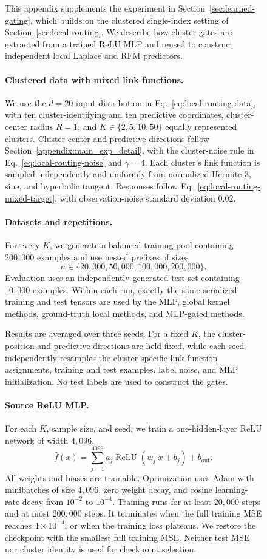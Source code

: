 \documentclass{article}
\newcounter{setting}[section]
\newcounter{initialization}[section]
\begin{document}
\begin{figure}
This appendix supplements the experiment in
Section~\ref{sec:learned-gating}, which builds on the clustered single-index
setting of Section~\ref{sec:local-routing}. We describe how cluster gates are
extracted from a trained ReLU MLP and reused to construct independent local
Laplace and RFM predictors.

\paragraph{Clustered data with mixed link functions.}
We use the \(d=20\) input distribution in
Eq.~\ref{eq:local-routing-data}, with ten cluster-identifying and ten
predictive coordinates, cluster-center radius \(R=1\), and
\(K\in\{2,5,10,50\}\) equally represented clusters. Cluster-center and
predictive directions follow Section~\ref{appendix:main_exp_detail},
with the cluster-noise rule in Eq.~\ref{eq:local-routing-noise} and
\(\gamma=4\). Each cluster's link function is sampled independently and
uniformly from normalized Hermite-3, sine, and hyperbolic tangent.
Responses follow Eq.~\ref{eq:local-routing-mixed-target}, with
observation-noise standard deviation \(0.02\).

\paragraph{Datasets and repetitions.}
For every \(K\), we generate a balanced training pool containing
\(200{,}000\) examples and use nested prefixes of sizes
\[
    n\in\{20{,}000,50{,}000,100{,}000,200{,}000\}.
\]
Evaluation uses an independently generated test set containing \(10{,}000\)
examples. Within each run, exactly the same serialized training and test
tensors are used by the MLP, global kernel methods, ground-truth local
methods, and MLP-gated methods.

Results are averaged over three seeds. For a fixed \(K\), the cluster-position
and predictive directions are held fixed, while each seed independently
resamples the cluster-specific link-function assignments, training and test
examples,
label noise, and MLP initialization. No test labels are used to construct the
gates.

\paragraph{Source ReLU MLP.}
For each \(K\), sample size, and seed, we train a one-hidden-layer ReLU network
of width \(4{,}096\),
\[
    \widehat f(x)
    =
    \sum_{j=1}^{4096}
    a_j\operatorname{ReLU}(w_j^\top x+b_j)
    +b_{\mathrm{out}}.
\]
All weights and biases are trainable. Optimization uses Adam with minibatches
of size \(4{,}096\), zero weight decay, and cosine learning-rate decay from
\(10^{-2}\) to \(10^{-4}\). Training runs for at least \(20{,}000\) steps and
at most \(200{,}000\) steps. It terminates when the full training MSE reaches
\(4\times10^{-4}\), or when the training loss plateaus. We restore the
checkpoint with the smallest full training MSE. Neither test MSE nor cluster
identity is used for checkpoint selection.


\end{figure}
\end{document}
